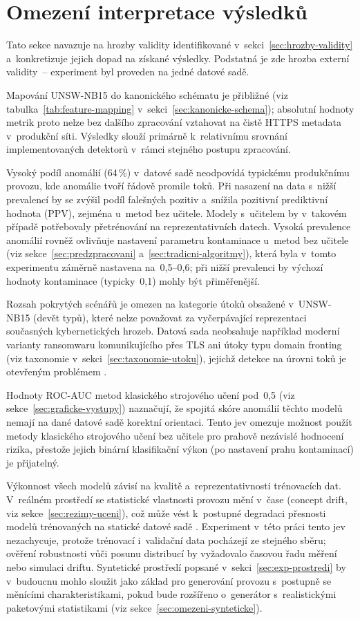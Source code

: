 \section{Omezení interpretace výsledků}
\label{sec:omezeni-vysledku}

Tato sekce navazuje na hrozby validity identifikované v~sekci~\ref{sec:hrozby-validity} a~konkretizuje jejich dopad na získané výsledky. Podstatná je zde hrozba externí validity~-- experiment byl proveden na jedné datové sadě.

Mapování UNSW-NB15 do kanonického schématu je přibližné (viz tabulka~\ref{tab:feature-mapping} v~sekci~\ref{sec:kanonicke-schema}); absolutní hodnoty metrik proto nelze bez dalšího zpracování vztahovat na čistě HTTPS metadata v~produkční síti. Výsledky slouží primárně k~relativnímu srovnání implementovaných detektorů v~rámci stejného postupu zpracování.

Vysoký podíl anomálií (64\,\%) v~datové sadě neodpovídá typickému produkčnímu provozu, kde anomálie tvoří řádově promile toků. Při nasazení na data s~nižší prevalencí by se zvýšil podíl falešných pozitiv a~snížila pozitivní prediktivní hodnota (PPV), zejména u~metod bez učitele. Modely s~učitelem by v~takovém případě potřebovaly přetrénování na reprezentativních datech. Vysoká prevalence anomálií rovněž ovlivňuje nastavení parametru kontaminace u~metod bez učitele (viz sekce~\ref{sec:predzpracovani} a~\ref{sec:tradicni-algoritmy}), která byla v~tomto experimentu záměrně nastavena na~0{,}5--0{,}6; při nižší prevalenci by výchozí hodnoty kontaminace (typicky~0{,}1) mohly být přiměřenější.

Rozsah pokrytých scénářů je omezen na kategorie útoků obsažené v~UNSW-NB15 (devět typů), které nelze považovat za vyčerpávající reprezentaci současných kybernetických hrozeb. Datová sada neobsahuje například moderní varianty ransomwaru komunikujícího přes TLS ani útoky typu domain fronting (viz taxonomie v~sekci~\ref{sec:taxonomie-utoku}), jejichž detekce na úrovni toků je otevřeným problémem \parencite{Ferdous2023}.

Hodnoty ROC-AUC metod klasického strojového učení pod~0{,}5 (viz sekce~\ref{sec:graficke-vystupy}) naznačují, že spojitá skóre anomálií těchto modelů nemají na dané datové sadě korektní orientaci. Tento jev omezuje možnost použít metody klasického strojového učení bez učitele pro prahově nezávislé hodnocení rizika, přestože jejich binární klasifikační výkon (po nastavení prahu kontaminací) je přijatelný.

Výkonnost všech modelů závisí na kvalitě a~reprezentativnosti trénovacích dat. V~reálném prostředí se statistické vlastnosti provozu mění v~čase (concept drift, viz sekce~\ref{sec:rezimy-uceni}), což může vést k~postupné degradaci přesnosti modelů trénovaných na statické datové sadě \parencite{Qing2025}. Experiment v~této práci tento jev nezachycuje, protože trénovací i~validační data pocházejí ze stejného sběru; ověření robustnosti vůči posunu distribucí by vyžadovalo časovou řadu měření nebo simulaci driftu. Syntetické prostředí popsané v~sekci~\ref{sec:exp-prostredi} by v~budoucnu mohlo sloužit jako základ pro generování provozu s~postupně se měnícími charakteristikami, pokud bude rozšířeno o~generátor s~realistickými paketovými statistikami (viz sekce~\ref{sec:omezeni-synteticke}).
